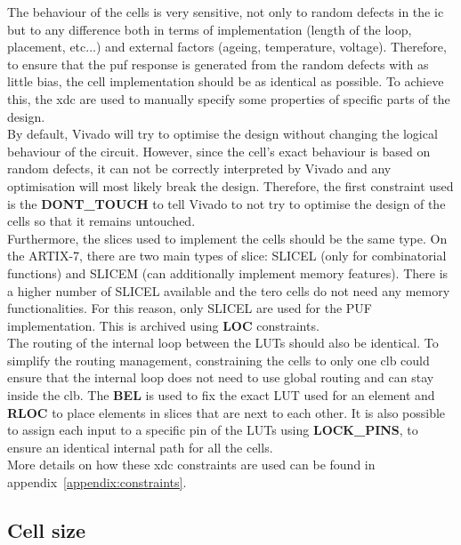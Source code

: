 The behaviour of the cells is very sensitive, not only to random defects in the \acrshort{ic} but to any difference both in terms of implementation (length of the loop, placement, etc...) and external factors (ageing, temperature, voltage). Therefore, to ensure that the \acrshort{puf} response is generated from the random defects with as little bias, the cell implementation should be as identical as possible. To achieve this, the \acrfull{xdc} are used to manually specify some properties of specific parts of the design.\\

By default, Vivado will try to optimise the design without changing the logical behaviour of the circuit. However, since the cell's exact behaviour is based on random defects, it can not be correctly interpreted by Vivado and any optimisation will most likely break the design. Therefore, the first constraint used is the \textbf{DONT\_TOUCH} to tell Vivado to not try to optimise the design of the cells so that it remains untouched.\\

Furthermore, the slices used to implement the cells should be the same type. On the ARTIX-7, there are two main types of slice: SLICEL (only for combinatorial functions) and SLICEM (can additionally implement memory features). There is a higher number of SLICEL available and the \acrshort{tero} cells do not need any memory functionalities. For this reason, only SLICEL are used for the PUF implementation. This is archived using \textbf{LOC} constraints.\\


The routing of the internal loop between the LUTs should also be identical. To simplify the routing management, constraining the cells to only one \acrshort{clb} could ensure that the internal loop does not need to use global routing and can stay inside the \acrshort{clb}. The \textbf{BEL} is used to fix the exact LUT used for an element and \textbf{RLOC} to place elements in slices that are next to each other. It is also possible to assign each input to a specific pin of the LUTs using \textbf{LOCK\_PINS}, to ensure an identical internal path for all the cells.\\
More details on how these \acrshort{xdc} constraints are used can be found in appendix~\ref{appendix:constraints}.\\

\subsection{Cell size}
\label{subsec:imple_cell_size}

